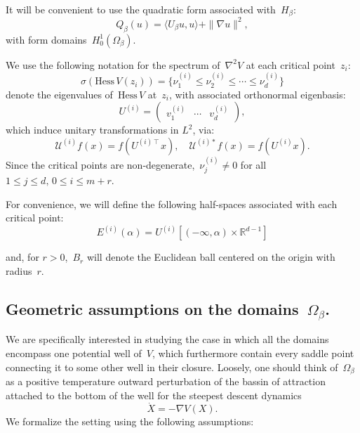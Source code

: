 \documentclass[10pt]{article}
\newcommand{\R}{\mathbb{R}}
\newcommand{\Hess}{\mathrm{Hess}\,}
\newcommand{\1}{\mathbbm 1}
\newcommand{\hessPassage}[2][]{U^{(#2)#1}} %
\newcommand{\hessEigvec}[2]{v^{(#1)}_{#2}} %
\newcommand{\hessEigval}[2]{\nu^{(#1)}_{#2}} %
\newcommand{\halfSpace}[1]{E^{(#1)}}
\begin{document}
    It will be convenient to use the quadratic form associated with~$H_\beta$:
    \begin{equation}
        \label{eq:witten_quad_form}
        Q_\beta(u) = \langle U_\beta u ,u \rangle + \|\nabla u\|^2,
    \end{equation}
    with form domains~$H_0^1(\Omega_\beta)$.

    We use the following notation for the spectrum of~$\nabla^2 V$ at each critical point~$z_i$:
    \[\sigma(\Hess V(z_i)) = \{\hessEigval{i}{1} \leq \hessEigval{i}{2} \leq \dotsm \leq \hessEigval{i}{d}\}\]
    denote the eigenvalues of~$\Hess V$ at~$z_i$, with associated orthonormal eigenbasis:
    \[U^{(i)} =\begin{pmatrix}\hessEigvec{i}{1}&\dotsm&\hessEigvec{i}{d}\end{pmatrix},\]
    which induce unitary transformations in $L^2$, via:
   ~\begin{equation}
    \label{eq:}
     \mathcal U^{(i)} f(x) = f\left( U^{(i)\intercal}x\right),\quad \mathcal U^{(i)*} f(x) = f\left( U^{(i)}x\right).
   \end{equation}
    Since the critical points are non-degenerate,~$\nu_j^{(i)} \neq 0$ for all~$1\leq j\leq d,\,0\leq i \leq m+r$.

    For convenience, we will define the following half-spaces associated with each critical point:
    \begin{equation}
        \label{eq:half_space}
        \halfSpace{i}(\alpha) = \hessPassage{i}\left[(-\infty,\alpha)\times\R^{d-1}\right]
    \end{equation}

    and, for $r>0$,~$B_r$ will denote the Euclidean ball centered on the origin with radius~$r$.
    \subsection{Geometric assumptions on the domains~$\Omega_\beta$.\newline}
    \label{subsect:harm_hypotheses}
    We are specifically interested in studying the case in which all the domains encompass one potential well of~$V$, which furthermore contain every saddle point connecting it to some other well in their closure.
    Loosely, one should think of~$\Omega_\beta$ as a positive temperature outward perturbation of the bassin of attraction attached to the bottom of the well for the steepest descent dynamics
    \begin{equation}
        \label{eq:gradient_flow}
        \dot X = -\nabla V(X).
    \end{equation}
    We formalize the setting using the following assumptions:
\end{document}
